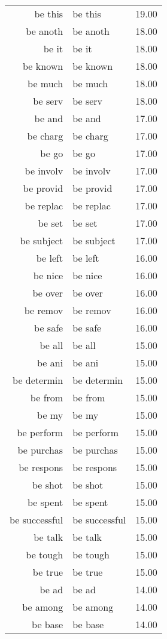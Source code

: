 \begin{table}[ht]
\begin{tabular}{rlr}
  be this & be this & 19.00 \\ 
  be anoth & be anoth & 18.00 \\ 
  be it & be it & 18.00 \\ 
  be known & be known & 18.00 \\ 
  be much & be much & 18.00 \\ 
  be serv & be serv & 18.00 \\ 
  be and & be and & 17.00 \\ 
  be charg & be charg & 17.00 \\ 
  be go & be go & 17.00 \\ 
  be involv & be involv & 17.00 \\ 
  be provid & be provid & 17.00 \\ 
  be replac & be replac & 17.00 \\ 
  be set & be set & 17.00 \\ 
  be subject & be subject & 17.00 \\ 
  be left & be left & 16.00 \\ 
  be nice & be nice & 16.00 \\ 
  be over & be over & 16.00 \\ 
  be remov & be remov & 16.00 \\ 
  be safe & be safe & 16.00 \\ 
  be all & be all & 15.00 \\ 
  be ani & be ani & 15.00 \\ 
  be determin & be determin & 15.00 \\ 
  be from & be from & 15.00 \\ 
  be my & be my & 15.00 \\ 
  be perform & be perform & 15.00 \\ 
  be purchas & be purchas & 15.00 \\ 
  be respons & be respons & 15.00 \\ 
  be shot & be shot & 15.00 \\ 
  be spent & be spent & 15.00 \\ 
  be successful & be successful & 15.00 \\ 
  be talk & be talk & 15.00 \\ 
  be tough & be tough & 15.00 \\ 
  be true & be true & 15.00 \\ 
  be ad & be ad & 14.00 \\ 
  be among & be among & 14.00 \\ 
  be base & be base & 14.00 \\ 

\end{tabular}
\end{table}
